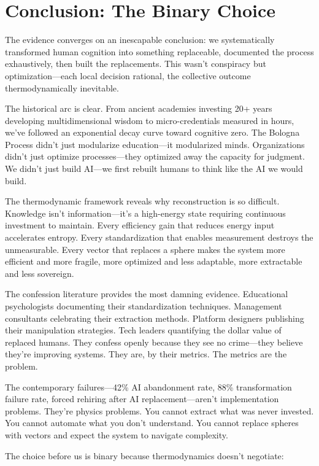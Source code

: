 \section{Conclusion: The Binary Choice}

The evidence converges on an inescapable conclusion: we systematically transformed human cognition into something replaceable, documented the process exhaustively, then built the replacements. This wasn't conspiracy but optimization---each local decision rational, the collective outcome thermodynamically inevitable.

The historical arc is clear. From ancient academies investing 20+ years developing multidimensional wisdom to micro-credentials measured in hours, we've followed an exponential decay curve toward cognitive zero. The Bologna Process didn't just modularize education---it modularized minds. Organizations didn't just optimize processes---they optimized away the capacity for judgment. We didn't just build AI---we first rebuilt humans to think like the AI we would build.

The thermodynamic framework reveals why reconstruction is so difficult. Knowledge isn't information---it's a high-energy state requiring continuous investment to maintain. Every efficiency gain that reduces energy input accelerates entropy. Every standardization that enables measurement destroys the unmeasurable. Every vector that replaces a sphere makes the system more efficient and more fragile, more optimized and less adaptable, more extractable and less sovereign.

The confession literature provides the most damning evidence. Educational psychologists documenting their standardization techniques. Management consultants celebrating their extraction methods. Platform designers publishing their manipulation strategies. Tech leaders quantifying the dollar value of replaced humans. They confess openly because they see no crime---they believe they're improving systems. They are, by their metrics. The metrics are the problem.

The contemporary failures---42\% AI abandonment rate, 88\% transformation failure rate, forced rehiring after AI replacement---aren't implementation problems. They're physics problems. You cannot extract what was never invested. You cannot automate what you don't understand. You cannot replace spheres with vectors and expect the system to navigate complexity.

The choice before us is binary because thermodynamics doesn't negotiate:

